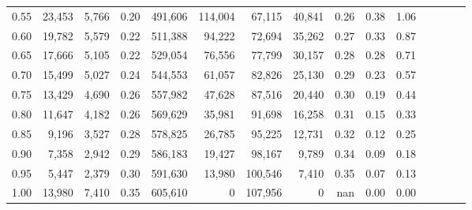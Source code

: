 \begin{tabular}{rrrcrrrrrrrrrrr}
0.55 &  23,453 &  5,766 &                                       0.20 &  491,606 &  114,004 &   67,115 &   40,841 &  0.26 &  0.38 &                         1.06 \\
0.60 &  19,782 &  5,579 &                                       0.22 &  511,388 &   94,222 &   72,694 &   35,262 &  0.27 &  0.33 &                         0.87 \\
0.65 &  17,666 &  5,105 &                                       0.22 &  529,054 &   76,556 &   77,799 &   30,157 &  0.28 &  0.28 &                         0.71 \\
0.70 &  15,499 &  5,027 &                                       0.24 &  544,553 &   61,057 &   82,826 &   25,130 &  0.29 &  0.23 &                         0.57 \\
0.75 &  13,429 &  4,690 &                                       0.26 &  557,982 &   47,628 &   87,516 &   20,440 &  0.30 &  0.19 &                         0.44 \\
0.80 &  11,647 &  4,182 &                                       0.26 &  569,629 &   35,981 &   91,698 &   16,258 &  0.31 &  0.15 &                         0.33 \\
0.85 &   9,196 &  3,527 &                                       0.28 &  578,825 &   26,785 &   95,225 &   12,731 &  0.32 &  0.12 &                         0.25 \\
0.90 &   7,358 &  2,942 &                                       0.29 &  586,183 &   19,427 &   98,167 &    9,789 &  0.34 &  0.09 &                         0.18 \\
0.95 &   5,447 &  2,379 &                                       0.30 &  591,630 &   13,980 &  100,546 &    7,410 &  0.35 &  0.07 &                         0.13 \\
1.00 &  13,980 &  7,410 &                                       0.35 &  605,610 &        0 &  107,956 &        0 &   nan &  0.00 &                         0.00 \\
\bottomrule
\end{tabular}
